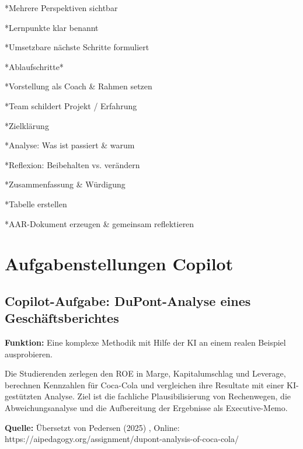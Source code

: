 \documentclass[
  ngerman,
  letterpaper,
  DIV=11]{scrreprt}
\newenvironment{Shaded}{\begin{snugshade}}{\end{snugshade}}
\newcommand{\NormalTok}[1]{\textcolor[rgb]{0.00,0.23,0.31}{#1}}
\begin{document}
\begin{tcolorbox}
\begin{Shaded}
\begin{Highlighting}[]
\NormalTok{*Mehrere Perspektiven sichtbar}

\NormalTok{*Lernpunkte klar benannt}

\NormalTok{*Umsetzbare nächste Schritte formuliert}

\NormalTok{*Ablaufschritte*}

\NormalTok{*Vorstellung als Coach \& Rahmen setzen}

\NormalTok{*Team schildert Projekt / Erfahrung}

\NormalTok{*Zielklärung}

\NormalTok{*Analyse: Was ist passiert \& warum}

\NormalTok{*Reflexion: Beibehalten vs. verändern}

\NormalTok{*Zusammenfassung \& Würdigung}

\NormalTok{*Tabelle erstellen}

\NormalTok{*AAR{-}Dokument erzeugen \& gemeinsam reflektieren}

\end{Highlighting}
\end{Shaded}

\end{tcolorbox}

\section{Aufgabenstellungen Copilot}\label{aufgabenstellungen-copilot}

\subsection{Copilot-Aufgabe: DuPont-Analyse eines
Geschäftsberichtes}\label{sec-prompt-dupont-analyse}

\textbf{Funktion:} Eine komplexe Methodik mit Hilfe der KI an einem
realen Beispiel ausprobieren.

Die Studierenden zerlegen den ROE in Marge, Kapitalumschlag und
Leverage, berechnen Kennzahlen für Coca-Cola und vergleichen ihre
Resultate mit einer KI-gestützten Analyse. Ziel ist die fachliche
Plausibilisierung von Rechenwegen, die Abweichungsanalyse und die
Aufbereitung der Ergebnisse als Executive-Memo.

\textbf{Quelle:} Übersetzt von Pedersen (2025) , Online:
https://aipedagogy.org/assignment/dupont-analysis-of-coca-cola/
\end{document}
